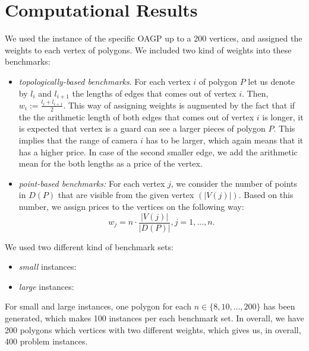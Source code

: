 \documentclass[runningheads,a4paper]{elsarticle}
\begin{document}
	\begin{comment}
	
	\noindent \textbf{Improvements of the above method.} The above method can serve as a basic iteration
	of a more advanced techniques like ILP-LNS or CMSA. In this case, methods for destructing the solutions
	has to be proposed.  Underlying idea could be:
	\begin{itemize}
	\item remove $N$ guards with the largest costs out of $C'$
	\item remove $N$ guards which have a higher amount of points from $D(P)$ covered by other guards, represented by the function
	\begin{align}
	ratio(i) = \frac{\sum_{v \in V\setminus{ \{i\}}, j \in V(i)} 1_{j \mbox{ is veasible from } v} }{|V(i)|}.
	\end{align}
	\end{itemize}
	\end{comment}
	
	\section{Computational Results}
	We used the instance of the specific OAGP up to a 200 vertices, and assigned the weights to each vertex of polygons. We included two kind of weights into these benchmarks:
	\begin{itemize}
		\item \emph{topologically-based benchmarks}. For each vertex $i$ of polygon $P$ let us denote by $l_i$ and $l_{i+1}$ the lengths of edges that comes out of vertex $i$. Then, $w_i := \frac{l_i + l_{i+1}}{2}$. This way of assigning weights is augmented by the fact that if the the arithmetic length of both edges that comes out of vertex $i$ is longer, it is expected that vertex is a guard can see a larger pieces of polygon $P$. This implies that the range of camera $i$ has to be larger, which again means that it has a higher price. In case of the second smaller edge, we add the arithmetic mean for the both lengths as a price of the vertex.  
		\item \emph{point-based benchmarks:} For each vertex $j$, we consider the number of points in $D(P)$ that are visible from the given vertex $(|V(j)|)$. Based on this number, we assign prices to the vertices on the following way:
		\begin{equation}
		w_j = n \cdot \frac{|V(j)|}{|D(P)|}, j=1,...,n.
		\end{equation}
	\end{itemize}
     We used two different kind of benchmark sets:
     \begin{itemize}
     	 \item \emph{small} instances:
     	 \item \emph{large} instances: 
     \end{itemize}
     For small and large instances, one polygon for each $n \in\{8,10,...,200\}$ has been generated, which makes 100 instances per each benchmark set. In overall, we have 200 polygons which vertices with two different weights, which gives us, in overall, 400 problem instances.
\end{document}
